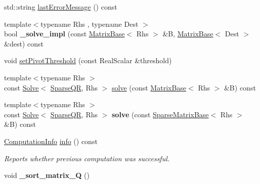 \begin{DoxyCompactItemize}
\item 
std\+::string \mbox{\hyperlink{class_eigen_1_1_sparse_q_r_a1222e59649d77125d91f1368cf293c63}{last\+Error\+Message}} () const
\item 
\mbox{\label{class_eigen_1_1_sparse_q_r_ad8a931d66ec8b8b6d383752f142242ad}} 
{\footnotesize template$<$typename Rhs , typename Dest $>$ }\\bool {\bfseries \+\_\+solve\+\_\+impl} (const \mbox{\hyperlink{class_eigen_1_1_matrix_base}{Matrix\+Base}}$<$ Rhs $>$ \&B, \mbox{\hyperlink{class_eigen_1_1_matrix_base}{Matrix\+Base}}$<$ Dest $>$ \&dest) const
\item 
void \mbox{\hyperlink{class_eigen_1_1_sparse_q_r_adb7bfa65f99e3ef91ed58ea663a850a1}{set\+Pivot\+Threshold}} (const Real\+Scalar \&threshold)
\item 
{\footnotesize template$<$typename Rhs $>$ }\\const \mbox{\hyperlink{class_eigen_1_1_solve}{Solve}}$<$ \mbox{\hyperlink{class_eigen_1_1_sparse_q_r}{Sparse\+QR}}, Rhs $>$ \mbox{\hyperlink{class_eigen_1_1_sparse_q_r_aea13a2c6823cd8408ba49afde9b3d4e4}{solve}} (const \mbox{\hyperlink{class_eigen_1_1_matrix_base}{Matrix\+Base}}$<$ Rhs $>$ \&B) const
\item 
\mbox{\label{class_eigen_1_1_sparse_q_r_a8a0a30096cfe15383f2a3cd5ba6cb5a4}} 
{\footnotesize template$<$typename Rhs $>$ }\\const \mbox{\hyperlink{class_eigen_1_1_solve}{Solve}}$<$ \mbox{\hyperlink{class_eigen_1_1_sparse_q_r}{Sparse\+QR}}, Rhs $>$ {\bfseries solve} (const \mbox{\hyperlink{class_eigen_1_1_sparse_matrix_base}{Sparse\+Matrix\+Base}}$<$ Rhs $>$ \&B) const
\item 
\mbox{\hyperlink{group__enums_ga85fad7b87587764e5cf6b513a9e0ee5e}{Computation\+Info}} \mbox{\hyperlink{class_eigen_1_1_sparse_q_r_a234b0580aaf57237393f2e73a3d38690}{info}} () const
\begin{DoxyCompactList}\small\item\em Reports whether previous computation was successful. \end{DoxyCompactList}\item 
\mbox{\label{class_eigen_1_1_sparse_q_r_a056948dc591c1030164c2dda73664640}} 
void {\bfseries \+\_\+sort\+\_\+matrix\+\_\+Q} ()
\end{DoxyCompactItemize}
